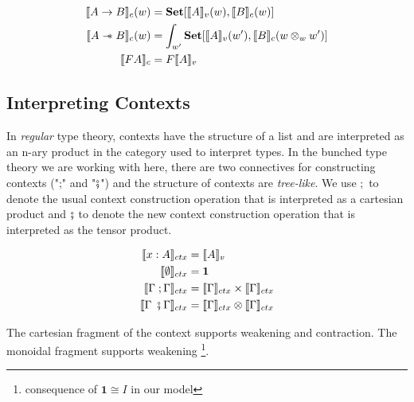 \documentclass{article}
\newcommand{\den}[1]{\llbracket #1 \rrbracket}
\newcommand{\sep}{\mathrel{-\mkern-6mu*}}
\begin{document}
\begin{align*}
    \den{A \rightarrow B }_c(w) &= \mathbf{Set}[ \den{A}_v(w) , \den{B}_c(w) ]\\
    \den{A \sep B}_c(w) &= \int_{w'} \mathbf{Set}[ \den{A}_v(w') , \den{B}_c(w \otimes_w w') ]\\
    \den{F A}_c &= F\den{A}_v\\
\end{align*}
\subsection{Interpreting Contexts}
In \textit{regular} type theory, contexts have the structure of a list and are interpreted as an n-ary product in the category used 
to interpret types. In the bunched type theory we are working with here, there are two connectives for constructing contexts 
(";" and "$\fatsemi$") and the structure of contexts are \textit{tree-like}. We use $;$ to denote the usual context construction operation 
that is interpreted as a cartesian product and $\fatsemi$ to denote the new context construction operation that is interpreted as the 
tensor product.

\begin{align*}
    \llbracket x : A \rrbracket_{ctx} &= \llbracket A \rrbracket_v \\
    \llbracket \emptyset \rrbracket_{ctx} &= \mathbf{1} \\
    \llbracket \Gamma \;; \Gamma \rrbracket_{ctx} &=  \llbracket \Gamma \rrbracket_{ctx} \times \llbracket \Gamma \rrbracket_{ctx}\\
    \llbracket \Gamma \;\fatsemi \Gamma \rrbracket_{ctx} &=  \llbracket \Gamma \rrbracket_{ctx} \otimes \llbracket \Gamma \rrbracket_{ctx} \\
\end{align*}

The cartesian fragment of the context supports weakening and contraction. The monoidal fragment supports weakening
\footnote{consequence of $\mathbf{1} \cong I$ in our model}.
\end{document}
